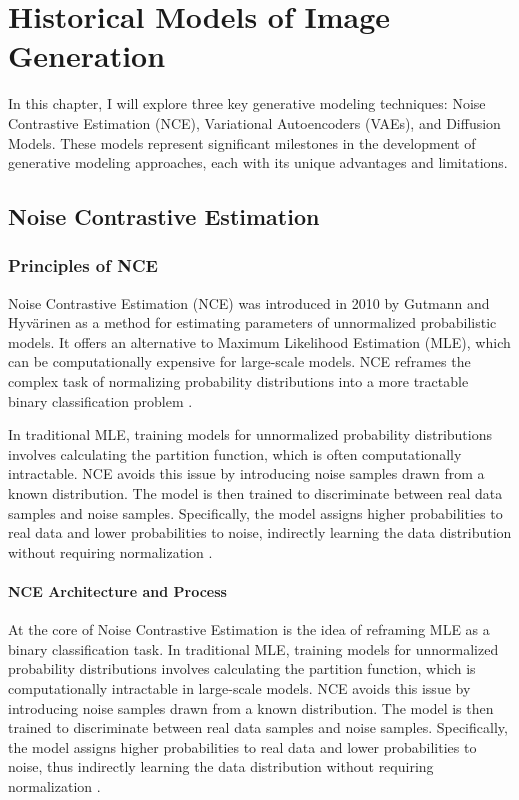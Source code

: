 \chapter{Historical Models of Image Generation}

In this chapter, I will explore three key generative modeling techniques: Noise Contrastive Estimation (NCE), Variational Autoencoders (VAEs), and Diffusion Models. These models represent significant milestones in the development of generative modeling approaches, each with its unique advantages and limitations. 

\section{Noise Contrastive Estimation}

\subsection{Principles of NCE}

Noise Contrastive Estimation (NCE) was introduced in 2010 by Gutmann and Hyvärinen as a method for estimating parameters of unnormalized probabilistic models. It offers an alternative to Maximum Likelihood Estimation (MLE), which can be computationally expensive for large-scale models. NCE reframes the complex task of normalizing probability distributions into a more tractable binary classification problem \citep{10.48550/arxiv.1711.00658}.

In traditional MLE, training models for unnormalized probability distributions involves calculating the partition function, which is often computationally intractable. NCE avoids this issue by introducing noise samples drawn from a known distribution. The model is then trained to discriminate between real data samples and noise samples. Specifically, the model assigns higher probabilities to real data and lower probabilities to noise, indirectly learning the data distribution without requiring normalization \citep{10.48550/arxiv.2110.11271}.

\subsubsection{NCE Architecture and Process}

At the core of Noise Contrastive Estimation is the idea of reframing MLE as a binary classification task. In traditional MLE, training models for unnormalized probability distributions involves calculating the partition function, which is computationally intractable in large-scale models. NCE avoids this issue by introducing noise samples drawn from a known distribution. The model is then trained to discriminate between real data samples and noise samples. Specifically, the model assigns higher probabilities to real data and lower probabilities to noise, thus indirectly learning the data distribution without requiring normalization \citep{10.48550/arxiv.2110.11271}.

